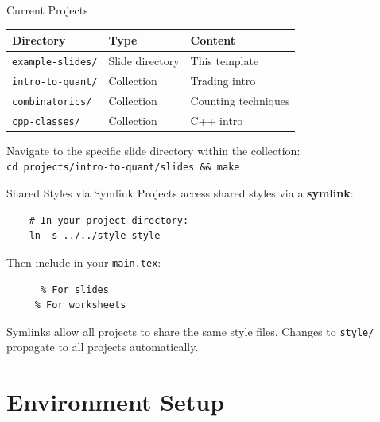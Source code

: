 \begin{frame}{Current Projects}
  \begin{tabular}{lll}
    \textbf{Directory} & \textbf{Type} & \textbf{Content} \\
    \hline
    \texttt{example-slides/} & Slide directory & This template \\
    \texttt{intro-to-quant/} & Collection & Trading intro \\
    \texttt{combinatorics/} & Collection & Counting techniques \\
    \texttt{cpp-classes/} & Collection & C++ intro \\
  \end{tabular}

  \vspace{0.5cm}
  \begin{sqt:tip}
    Navigate to the specific slide directory within the collection:\\
    \texttt{cd projects/intro-to-quant/slides \&\& make}
  \end{sqt:tip}
\end{frame}

\begin{frame}[fragile]{Shared Styles via Symlink}
  Projects access shared styles via a \textbf{symlink}:
  \begin{verbatim}
    # In your project directory:
    ln -s ../../style style
  \end{verbatim}

  \vspace{0.5cm}
  Then include in your \verb|main.tex|:
  \begin{verbatim}
      % For slides
     % For worksheets
  \end{verbatim}

  \vspace{0.5cm}
  \begin{sqt:definition}
    Symlinks allow all projects to share the same style files.
    Changes to \texttt{style/} propagate to all projects automatically.
  \end{sqt:definition}
\end{frame}

\section{Environment Setup}

